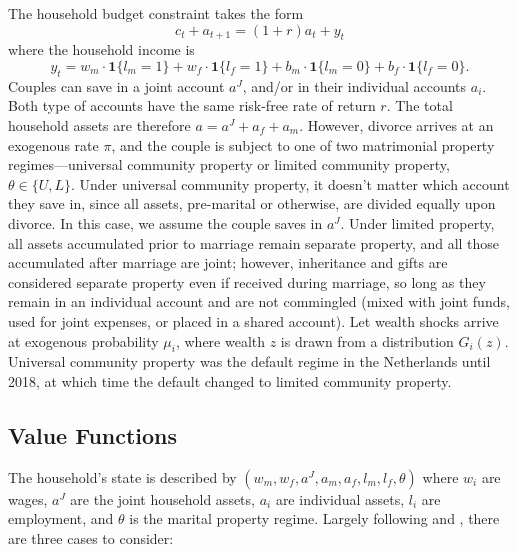 \documentclass{article}
\begin{document}
The household budget constraint takes the form \begin{equation*}
    c_t+a_{t+1}=(1+r)a_t+y_t
\end{equation*} where the household income is \begin{equation*}
    y_t=w_m\cdot\mathbf{1}\{l_m=1\}+w_f\cdot\mathbf{1}\{l_f=1\}+b_m\cdot\mathbf{1}\{l_m=0\}+b_f\cdot\mathbf{1}\{l_f=0\}.
\end{equation*}
Couples can save in a joint account $a^J$, and/or in their individual accounts $a_i$. Both type of accounts have the same risk-free rate of return $r$. The total household assets are therefore $a=a^J+a_f+a_m$. However, divorce arrives at an exogenous rate $\pi$, and the couple is subject to one of two matrimonial property regimes—universal community property or limited community property, $\theta\in\{U,L\}$. Under universal community property, it doesn't matter which account they save in, since all assets, pre-marital or otherwise, are divided equally upon divorce. In this case, we assume the couple saves in $a^J$. Under limited property, all assets accumulated prior to marriage remain separate property, and all those accumulated after marriage are joint; however, inheritance and gifts are considered separate property even if received during marriage, so long as they remain in an individual account and are not commingled (mixed with joint funds, used for joint expenses, or placed in a shared account). Let wealth shocks arrive at exogenous probability $\mu_i$, where wealth $z$ is drawn from a distribution $G_i(z)$. Universal community property was the default regime in the Netherlands until 2018, at which time the default changed to limited community property. 


\subsection*{Value Functions}
The household's state is described by $(w_m, w_f, a^J, a_m, a_f, l_m, l_f, \theta)$ where $w_i$ are wages, $a^J$ are the joint household assets, $a_i$ are individual assets, $l_i$ are employment, and $\theta$ is the marital property regime. Largely following \cite{GULER2012352} and \cite{pilossoph_wee}, there are three cases to consider:
\end{document}
